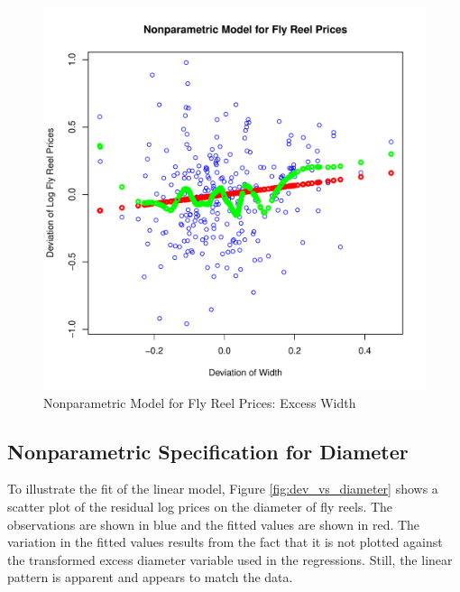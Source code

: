 \begin{figure}[h!]
  \centering
  \includegraphics[scale = 0.5, keepaspectratio=true]{../Figures/dev_np_vs_width_dev}
  \caption{Nonparametric Model for Fly Reel Prices: Excess Width} \label{fig:dev_np_vs_width_dev}
\end{figure}


\clearpage
\subsection{Nonparametric Specification for Diameter}

To illustrate the fit of the linear model, 
Figure \ref{fig:dev_vs_diameter} shows a scatter plot 
of the residual log prices on 
the diameter of fly reels. 
The observations are shown in blue
and the fitted values are shown in red.
The variation in the fitted values results from the 
fact that it is not plotted against the transformed 
excess diameter variable 
used in the regressions.
Still, the linear pattern is apparent
and appears to match the data. 

